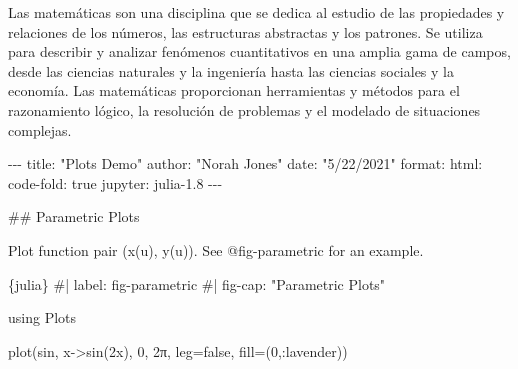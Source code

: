 \documentclass[
  letterpaper,
]{article}
\newenvironment{Shaded}{}{}
\newcommand{\AnnotationTok}[1]{\textcolor[rgb]{0.42,0.45,0.49}{#1}}
\newcommand{\CommentTok}[1]{\textcolor[rgb]{0.42,0.45,0.49}{#1}}
\newcommand{\DecValTok}[1]{\textcolor[rgb]{0.00,0.36,0.77}{#1}}
\newcommand{\FunctionTok}[1]{\textcolor[rgb]{0.44,0.26,0.76}{#1}}
\newcommand{\InformationTok}[1]{\textcolor[rgb]{0.42,0.45,0.49}{#1}}
\newcommand{\NormalTok}[1]{\textcolor[rgb]{0.14,0.16,0.18}{#1}}
\begin{document}
\leavevmode{}%
Las matemáticas son una disciplina que se dedica al estudio de las
propiedades y relaciones de los números, las estructuras abstractas y
los patrones. Se utiliza para describir y analizar fenómenos
cuantitativos en una amplia gama de campos, desde las ciencias naturales
y la ingeniería hasta las ciencias sociales y la economía. Las
matemáticas proporcionan herramientas y métodos para el razonamiento
lógico, la resolución de problemas y el modelado de situaciones
complejas.

\begin{Shaded}
\begin{Highlighting}[]
\CommentTok{{-}{-}{-}}
\AnnotationTok{title:}\CommentTok{ "Plots Demo"}
\AnnotationTok{author:}\CommentTok{ "Norah Jones"}
\AnnotationTok{date:}\CommentTok{ "5/22/2021"}
\AnnotationTok{format:}
\CommentTok{  html:}
\CommentTok{    code{-}fold: true}
\AnnotationTok{jupyter:}\CommentTok{ julia{-}1.8}
\CommentTok{{-}{-}{-}}

\FunctionTok{\#\# Parametric Plots}

\NormalTok{Plot function pair (x(u), y(u)). }
\NormalTok{See @fig{-}parametric for an example.}

\InformationTok{\textasciigrave{}\textasciigrave{}\textasciigrave{}\{julia\}}
\CommentTok{\#| label: fig{-}parametric}
\CommentTok{\#| fig{-}cap: "Parametric Plots"}

\NormalTok{using Plots}

\NormalTok{plot(}\FunctionTok{sin}\NormalTok{, }
\NormalTok{     x{-}\textgreater{}}\FunctionTok{sin}\NormalTok{(}\DecValTok{2}\NormalTok{x), }
     \DecValTok{0}\NormalTok{, }
     \DecValTok{2}\NormalTok{π, }
\NormalTok{     leg=false, }
\NormalTok{     fill=(}\DecValTok{0}\NormalTok{,:lavender))}
\InformationTok{\textasciigrave{}\textasciigrave{}\textasciigrave{}}
\end{Highlighting}
\end{Shaded}
\end{document}
